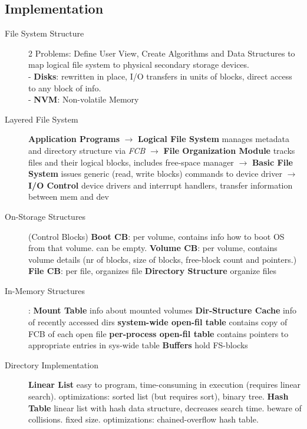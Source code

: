 \subsection*{Implementation}
\begin{description}
    \item[File System Structure]2 Problems: Define User View, Create Algorithms and Data Structures to map logical file system to physical secondary storage devices.\\
        - \textbf{Disks}: rewritten in place, I/O transfers in units of blocks, direct access to any block of info. \\
        - \textbf{NVM}: Non-volatile Memory \\
    \item[Layered File System]\textbf{Application Programs} $\rightarrow$ \textbf{Logical File System} manages metadata and directory structure via \textit{FCB} $\rightarrow$ \textbf{File Organization Module} tracks files and their logical blocks, includes free-space manager $\rightarrow$ \textbf{Basic File System} issues generic (read, write blocks) commands to device driver $\rightarrow$ \textbf{I/O Control} device drivers and interrupt handlers, transfer information between mem and dev
    \item[On-Storage Structures] (Control Blocks) \textbf{Boot CB}: per volume, contains info how to boot OS from that volume. can be empty. \textbf{Volume CB}: per volume, contains volume details (nr of blocks, size of blocks, free-block count and pointers.) \textbf{File CB}: per file, organizes file \textbf{Directory Structure} organize files  %
    \item[In-Memory Structures]: \textbf{Mount Table} info about mounted volumes \textbf{Dir-Structure Cache} info of recently accessed dirs \textbf{system-wide open-fil table} contains copy of FCB of each open file \textbf{per-process open-fil table} contains pointers to appropriate entries in sys-wide table \textbf{Buffers} hold FS-blocks %
    \item[Directory Implementation] \textbf{Linear List} easy to program, time-consuming in execution (requires linear search). optimizations: sorted list (but requires sort), binary tree. \textbf{Hash Table} linear list with hash data structure, decreases search time. beware of collisions. fixed size. optimizations: chained-overflow hash table.

\end{description}
